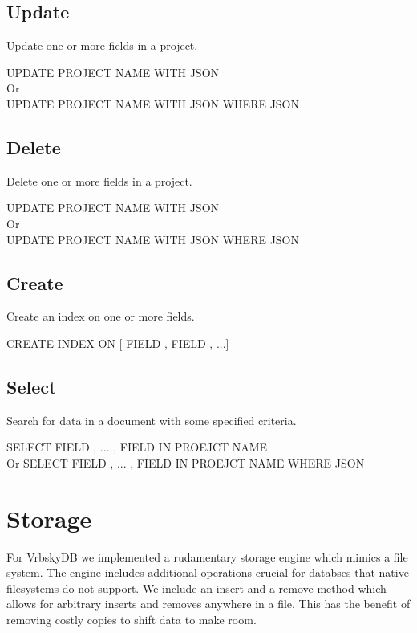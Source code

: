 \documentclass{article}
\newcommand\la{\textlangle\xspace}
\newcommand\ra{\textrangle\xspace}
\begin{document}
\subsection{Update}
Update one or more fields in a project.
\begin{center}
UPDATE \la PROJECT NAME \ra WITH \la JSON \ra \\
Or \\
UPDATE \la PROJECT NAME \ra WITH \la JSON \ra WHERE \la JSON \ra \\
\end{center}

\subsection{Delete}
Delete one or more fields in a project.
\begin{center}
UPDATE \la PROJECT NAME \ra WITH \la JSON \ra \\
Or \\
UPDATE \la PROJECT NAME \ra WITH \la JSON \ra WHERE \la JSON \ra \\
\end{center}

\subsection{Create}
Create an index on one or more fields.
\begin{center}
CREATE INDEX ON [\la FIELD \ra, \la FIELD \ra, ...]
\end{center}

\subsection{Select}
Search for data in a document with some specified criteria.
\begin{center}
SELECT \la FIELD \ra, ... , \la FIELD \ra IN \la PROEJCT NAME \ra \\
Or
SELECT \la FIELD \ra, ... , \la FIELD \ra IN \la PROEJCT NAME \ra WHERE \la JSON \ra
\end{center}

\section{Storage}

For VrbskyDB we implemented a rudamentary storage engine which mimics a file system.
The engine includes additional operations crucial for databses that native filesystems do not support.
We include an insert and a remove method which allows for arbitrary inserts and removes anywhere in a file.
This has the benefit of removing costly copies to shift data to make room.
\end{document}
